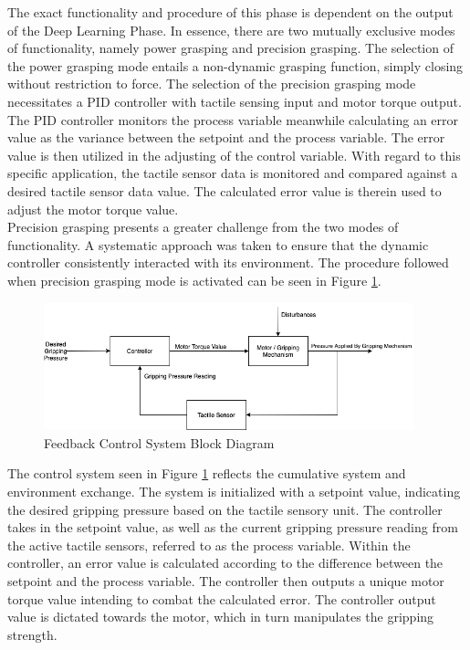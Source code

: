 \documentclass[11.5pt]{article}
\begin{document}
The exact functionality and procedure of this phase is dependent on the output of the Deep Learning Phase. In essence, there are two mutually exclusive modes of functionality, namely power grasping and precision grasping. The selection of the power grasping mode entails a non-dynamic grasping function, simply closing without restriction to force. The selection of the precision grasping mode necessitates a PID controller with tactile sensing input and motor torque output. The PID controller monitors the process variable meanwhile calculating an error value as the variance between the setpoint and the process variable. The error value is then utilized in the adjusting of the control variable. With regard to this specific application, the tactile sensor data is monitored and compared against a desired tactile sensor data value. The calculated error value is therein used to adjust the motor torque value. \\

Precision grasping presents a greater challenge from the two modes of functionality. A systematic approach was taken to ensure that the dynamic controller consistently interacted with its environment. The procedure followed when precision grasping mode is activated can be seen in Figure \ref{fig:PID}. 

\begin{figure}[H]
    \centering
    \includegraphics[width=0.955\textwidth]{assets/CSBD.png}
    \caption{Feedback Control System Block Diagram}
    \label{fig:PID}
\end{figure}

The control system seen in Figure \ref{fig:PID} reflects the cumulative system and environment exchange. The system is initialized with a setpoint value, indicating the desired gripping pressure based on the tactile sensory unit. The controller takes in the setpoint value, as well as the current gripping pressure reading from the active tactile sensors, referred to as the process variable. Within the controller, an error value is calculated according to the difference between the setpoint and the process variable. The controller then outputs a unique motor torque value intending to combat the calculated error. The controller output value is dictated towards the motor, which in turn manipulates the gripping strength. 
\end{document}
